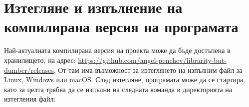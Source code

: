 \section{Изтегляне и изпълнение на компилирана версия на програмата}
Най-актуалната компилирана версия на проекта може да бъде достъпена в хранилището, на адрес: \url{https://github.com/angel-penchev/librarity-but-dumber/releases}. От там има възможност за изтеглянето на изпълним файл за Linux, Windows или macOS. След изтегляне, програмата може да се стартира, като за целта трябва да се изпълни на следната команда в директорията на изтегления файл:

